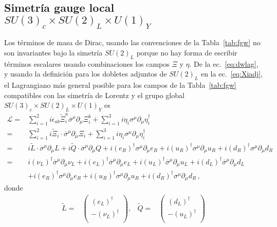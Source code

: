 \begin{frame}
\section{Simetría gauge local $SU(3)_c\times  SU(2)_L\times  U(1)_Y$}
Los términos de masa de Dirac, usando las convenciones de la
Tabla~\ref{tab:fgw} no son invariantes bajo la simetría $SU(2)_L$ porque
no hay forma de escribir términos escalares usando combinaciones los
campos $\Xi$ y $\eta$.  De la ec.~\eqref{eq:dwlag}, y usando la definición para los dobletes adjuntos de $SU(2)_L$ en la ec.~\eqref{eq:Xiadj}, el Lagrangiano más
general posible para los campos de la Tabla~\ref{tab:fgw} compatibles
con las simetría de Lorentz y el grupo global $SU(3)_c\times
SU(2)_L\times U(1)_Y$ es
\begin{align}
  \mathcal{L}=&\sum_{i=1}^2i\epsilon_{ab}\widetilde{\Xi}_i^{a}\overline{\sigma}^{\mu}\partial_{\mu}\Xi_i^{b}
+\sum_{i=1}^3i\eta_{i}\sigma^{\mu}\partial_{\mu} \eta^{\dagger}_i\nonumber\\
  =&\sum_{i=1}^2i\widetilde{\Xi}_i\cdot\overline{\sigma}^{\mu}\partial_{\mu}\Xi_i
+\sum_{i=1}^3i\eta_{i}\sigma^{\mu}\partial_{\mu} \eta^{\dagger}_i\nonumber\\
=&i\widetilde{L}\cdot\overline{\sigma}^{\mu}\partial_{\mu}L+i\widetilde{Q}\cdot\overline{\sigma}^{\mu}\partial_{\mu}Q
+i(e_R)^{\dagger}\sigma^{\mu}\partial_{\mu} e_R+i(u_R)^{\dagger}\sigma^{\mu}\partial_{\mu} u_R+i
(d_R)^{\dagger}\sigma^{\mu}\partial_{\mu} d_R \nonumber\\
=&i(\nu_L)^{\dagger}\overline{\sigma}^{\mu}\partial_{\mu}\nu_L+i(e_L)^{\dagger}\overline{\sigma}^{\mu}\partial_{\mu}e_L
+i (u_L)^{\dagger}\overline{\sigma}^{\mu}\partial_{\mu}u_L+i(d_L)^{\dagger}\overline{\sigma}^{\mu}\partial_{\mu}d_L \nonumber\\
&+i(e_R)^{\dagger}\sigma^{\mu}\partial_{\mu}e_R+i(u_R)^{\dagger}\sigma^{\mu}\partial_{\mu} u_R+i(d_R)^{\dagger}\sigma^{\mu}\partial_{\mu} d_R \,,
\end{align}
donde
\begin{align}
\label{eq:widetildeLQ}
  \widetilde{L}=&
  \begin{pmatrix}
   \left(e_L\right)^{\dagger}\\
  - \left(\nu_L  \right)^{\dagger}\\
  \end{pmatrix},&
  \widetilde{Q}=&
  \begin{pmatrix}
   \left(d_L\right)^{\dagger}\\
  - \left(u_L  \right)^{\dagger}\\

\end{pmatrix}
\end{align}
\end{frame}
